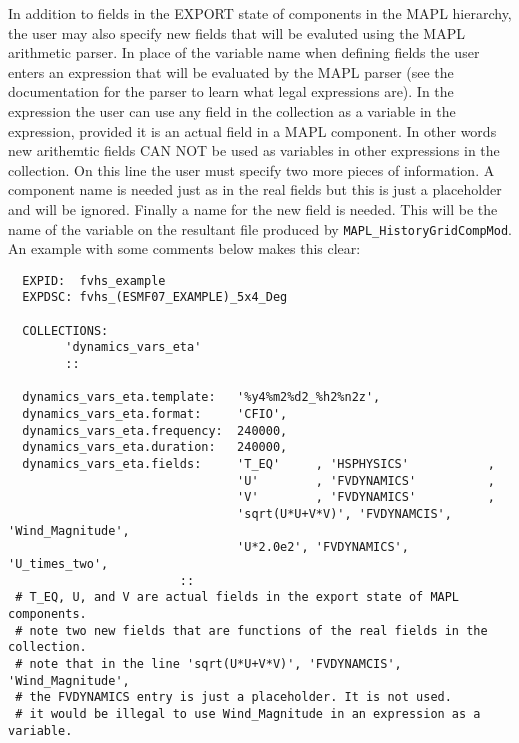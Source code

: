 In addition to fields in the EXPORT state of components in the MAPL hierarchy,
the user may also specify new fields that will be evaluted using the MAPL
arithmetic parser. In place of the variable name when defining fields
the user enters an expression that will be evaluated by the MAPL parser (see the documentation for the parser
to learn what legal expressions are). In the expression the user can use any field
in the collection as a variable in the expression, provided it is an actual field
in a MAPL component. In other words new arithemtic fields CAN NOT be used as variables
in other expressions in the collection.
On this line the user must specify two more pieces of information. A component
name is needed just as in the real fields but this is just a placeholder and will be ignored. Finally a name for the
new field is needed. This will be the name of the variable on the resultant file produced by {\tt MAPL\_HistoryGridCompMod}. 
An example with some comments below makes this clear: 
 \begin{verbatim}
  EXPID:  fvhs_example
  EXPDSC: fvhs_(ESMF07_EXAMPLE)_5x4_Deg

  COLLECTIONS:
        'dynamics_vars_eta'
        ::

  dynamics_vars_eta.template:   '%y4%m2%d2_%h2%n2z',
  dynamics_vars_eta.format:     'CFIO',
  dynamics_vars_eta.frequency:  240000,
  dynamics_vars_eta.duration:   240000,
  dynamics_vars_eta.fields:     'T_EQ'     , 'HSPHYSICS'           ,
                                'U'        , 'FVDYNAMICS'          ,
                                'V'        , 'FVDYNAMICS'          ,
                                'sqrt(U*U+V*V)', 'FVDYNAMCIS', 'Wind_Magnitude',
                                'U*2.0e2', 'FVDYNAMICS', 'U_times_two', 
                        ::
 # T_EQ, U, and V are actual fields in the export state of MAPL components.
 # note two new fields that are functions of the real fields in the collection.
 # note that in the line 'sqrt(U*U+V*V)', 'FVDYNAMCIS', 'Wind_Magnitude',
 # the FVDYNAMICS entry is just a placeholder. It is not used.
 # it would be illegal to use Wind_Magnitude in an expression as a variable.
 \end{verbatim}
